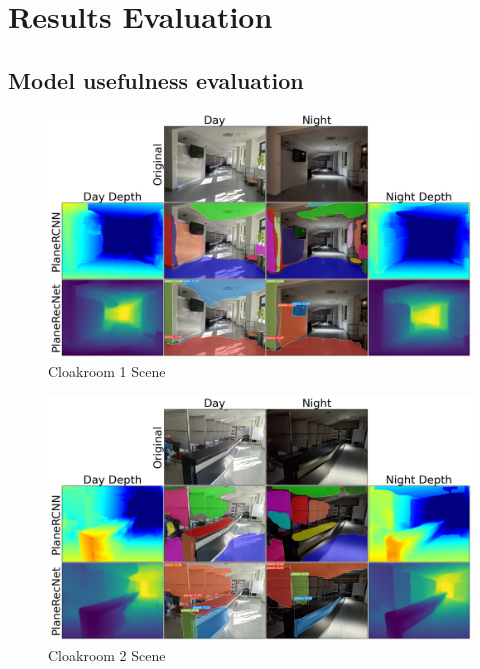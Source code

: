 \chapter{Results Evaluation} \label{chap:results-evaluation}

\section{Model usefulness evaluation} \label{sec:model-usefulness-evaluation}

\begin{figure}[H]
    \centering
    \includegraphics[width=1.0\textwidth]{images/results/Cloakroom_1.png}
    \caption{Cloakroom 1 Scene}
    \label{figure:Cloakroom_1}
\end{figure}

\begin{figure}[H]
    \centering
    \includegraphics[width=1.0\textwidth]{images/results/Cloakroom_2.png}
    \caption{Cloakroom 2 Scene}
    \label{figure:Cloakroom_2}
\end{figure}

